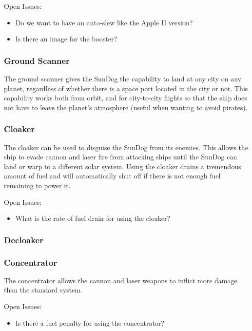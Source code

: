 Open Issues:
\begin{itemize}
\item Do we want to have an auto-slew like the Apple II version?
\item Is there an image for the booster?
\end{itemize}

\subsubsection{Ground Scanner}

The ground scanner gives the SunDog the capability to land at any city
on any planet, regardless of whether there is a space port located in
the city or not.  This capability works both from orbit, and for
city-to-city flights so that the ship does not have to leave the planet's
atmosphere (useful when wanting to avoid pirates).

\subsubsection{Cloaker}

The cloaker can be used to disguise the SunDog from its enemies.  This allows
the ship to evade cannon and laser fire from attacking ships until the
SunDog can land or warp to a different solar system.  Using the cloaker
drains a tremendous amount of fuel and will automatically shut off if there
is not enough fuel remaining to power it.

Open Issues:
\begin{itemize}
\item What is the rate of fuel drain for using the cloaker?
\end{itemize}

\subsubsection{Decloaker}

\subsubsection{Concentrator}

The concentrator allows the cannon and laser weapons to inflict more damage
than the standard system.

Open Issues:
\begin{itemize}
\item Is there a fuel penalty for using the concentrator?
\end{itemize}

